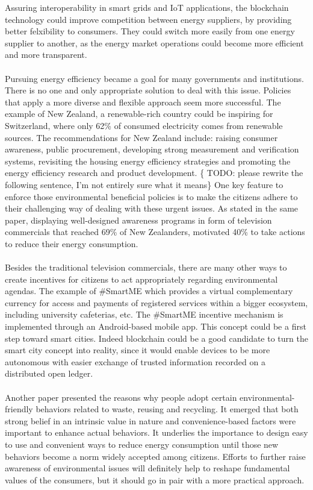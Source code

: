 \documentclass[11pt]{article}
\begin{document}
Assuring interoperability in smart grids and IoT applications, the blockchain technology could improve competition between energy suppliers, by providing better felxibility to consumers. They could switch more easily from one energy supplier to another, as the energy market operations could become more efficient and more transparent.\cite{20}\\\\
Pursuing energy efficiency became a goal for many governments and institutions. There is no one and only appropriate solution to deal with this issue. Policies that apply a more diverse and flexible approach seem more successful. The example of New Zealand, a renewable-rich country could be inspiring for Switzerland, where only 62\% of consumed electricity comes from renewable sources\cite{10}. The recommendations for New Zealand include: raising consumer awareness, public procurement, developing strong measurement and verification systems, revisiting the housing energy efficiency strategies and promoting the energy efficiency research and product development. \{\color{red} TODO: please rewrite the following sentence, I'm not entirely sure what it means\color{black}\}    One key feature to enforce those environmental beneficial policies is to make the citizens adhere to their challenging way of dealing with these urgent issues. As stated in the same paper, displaying well-designed awareness programs in form of television commercials that reached 69\% of New Zealanders, motivated 40\% to take actions to reduce their energy consumption. \cite{11}\\\\
Besides the traditional television commercials, there are many other ways to create incentives for citizens to act appropriately regarding environmental agendas. The example of \#SmartME which provides a virtual complementary currency for access and payments of registered services within a bigger ecosystem, including university cafeterias, etc. The \#SmartME incentive mechanism is implemented through an Android-based mobile app. This concept could be a first step toward smart cities. Indeed blockchain could be a good candidate to turn the smart city concept into reality, since it would enable devices to be more autonomous with easier exchange of trusted information recorded on a distributed open ledger.\cite{12}\\\\
Another paper presented the reasons why people adopt certain environmental-friendly behaviors related to waste, reusing and recycling. It emerged that both strong belief in an intrinsic value in nature and convenience-based factors were important to enhance actual behaviors. It underlies the importance to design easy to use and convenient ways to reduce energy consumption until those new behaviors become a norm widely accepted among citizens. Efforts to further raise awareness of environmental issues will definitely help to reshape fundamental values of the consumers, but it should go in pair with a more practical approach.\cite{13}\\\\
\end{document}
